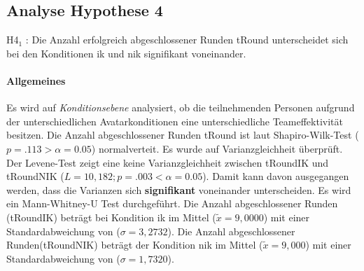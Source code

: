 \documentclass[a4paper,11pt]{article}%
\renewcommand{\\}{\vspace*{0.5\baselineskip} \newline}
\begin{document}
	\subsection{Analyse Hypothese 4}
H4$_{1}$ : Die Anzahl erfolgreich abgeschlossener Runden \ac{tRound} unterscheidet sich bei den Konditionen \ac{ik} und \ac{nik} signifikant voneinander.

\paragraph{Allgemeines}

Es wird auf \textit{Konditionsebene} analysiert, ob die teilnehmenden Personen aufgrund der unterschiedlichen Avatarkonditionen eine unterschiedliche Teameffektivität besitzen.\\
Die Anzahl abgeschlossener Runden \ac{tRound} ist laut Shapiro-Wilk-Test ($p = .113 > \alpha = 0.05$) normalverteit.\\
Es wurde auf Varianzgleichheit überprüft. Der Levene-Test zeigt eine keine Varianzgleichheit zwischen \ac{tRoundIK} und \ac{tRoundNIK} ($L = 10,182; p=.003 < \alpha = 0.05$). Damit kann davon ausgegangen werden, dass die Varianzen sich \textbf{signifikant} voneinander unterscheiden. Es wird ein Mann-Whitney-U Test durchgeführt. \\
Die Anzahl abgeschlossener Runden (\ac{tRoundIK}) beträgt bei Kondition \ac{ik} im Mittel ($\tilde x = 9,0000$) mit einer Standardabweichung von ($\sigma = 3,2732$).\newline 
Die Anzahl abgeschlossener Runden(\ac{tRoundNIK}) beträgt der Kondition \ac{nik} im Mittel ($\tilde x = 9,000$) mit einer Standardabweichung von ($\sigma = 1,7320$).

\end{document}
